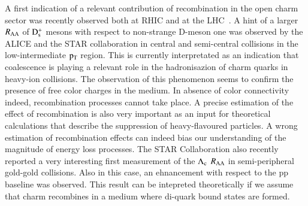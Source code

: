 \documentclass{webofc}
\begin{document}
A first indication of a relevant contribution of recombination in the open charm sector was recently observed both at RHIC and at the LHC~\cite{recomb1,recomb2}. A hint of a larger $R_{\mathrm{AA}}$ of $\rm D_{s}^{+}$ mesons with respect to non-strange 
D-meson one was observed by the ALICE and the STAR collaboration in central and semi-central collisions in the low-intermediate $\rm p_{\rm T} $ region. This is currently interpretated as an indication that coalescence is playing 
a relevant role in the hadronisazion of charm quarks in heavy-ion collisions. The observation of this phenomenon seems to confirm the presence of free color charges in the medium. 
In absence of color connectivity indeed, recombination processes cannot take place. A precise estimation of the effect of 
recombination is also very important as an input for theoretical calculations that describe the suppression of heavy-flavoured particles. A wrong estimation of recombination effects can indeed 
bias our understanding of the magnitude of energy loss processes. The STAR Collaboration also recently reported a very interesting first measurement of the $\rm \Lambda_{c}$ 
$R_{\mathrm{AA}}$ in semi-peripheral gold-gold collisions. Also in this case, an ehnancement with respect to the pp baseline was observed. This result can be intepreted theoretically if we assume that charm 
recombines in a medium where  di-quark bound states are formed. 
\end{document}
